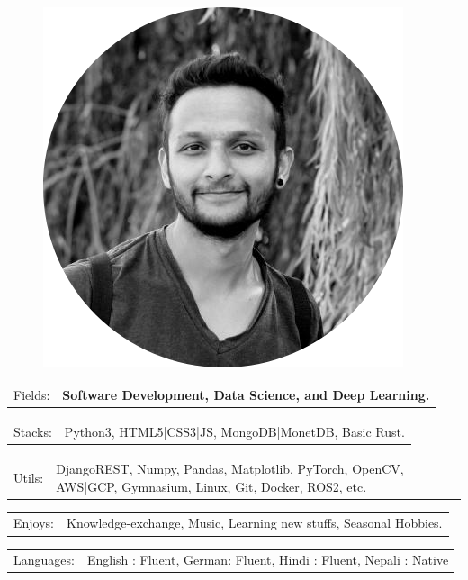 \documentclass[10pt,A4]{article}
\newcommand{\tzlarrow}{(0,0) -- (0.2,0) -- (0.3,0.2) -- (0.2,0.4) -- (0,0.4) -- (0.1,0.2) -- cycle;}
\newcommand{\larrow}[1]
{\begin{tikzpicture}[scale=0.58]
	 \filldraw[fill=#1!100,draw=#1!100!black]  \tzlarrow
 \end{tikzpicture}
}
\newcommand{\metasection}[2]
{
\begin{tabular*}{1\textwidth}{p{2.4cm} p{11cm}}
\larrow{bgcol}	\normalsize{\textcolor{sectcol}{#1}}&#2\\[12pt]
\end{tabular*}
}
\begin{document}
\pagestyle{fancy}


\vspace{-20.55pt}


\hspace{-0.25\linewidth}\colorbox{bgcol}{}



\begin{figure}[H]
\begin{flushright}
	\includegraphics[width=0.20\linewidth]{profile.png}	%
\end{flushright}
\end{figure}



\vspace{-130pt}

\metasection{Fields:}{\textbf{Software Development, Data Science, and Deep Learning.}}
\metasection{Stacks:}{Python3, HTML5|CSS3|JS, MongoDB|MonetDB, Basic Rust.}
\vspace{5pt}
\metasection{Utils:}{DjangoREST, Numpy, Pandas, Matplotlib, PyTorch, OpenCV, AWS|GCP,
	Gymnasium, Linux, Git, Docker, ROS2, etc. }
\metasection{Enjoys:}{Knowledge-exchange, Music, Learning new stuffs, Seasonal Hobbies. }
\metasection{Languages:}{English : Fluent, German: Fluent, Hindi : Fluent, Nepali : Native}
\end{document}
